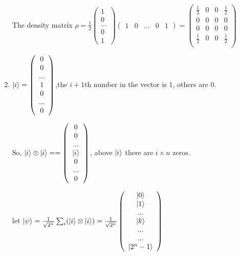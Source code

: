 \documentclass{article}
\begin{document}
\begin{enumerate}
          The density matrix $\rho=\frac{1}{2}\left(\begin{array}{c}1\\0\\...\\0\\1\end{array}\right)\left(\begin{array}{ccccc}1&0&...&0&1\end{array}\right)=
              \left(\begin{array}{cccc}
                      \frac{1}{2} & 0 & 0 & \frac{1}{2} \\
                      0           & 0 & 0 & 0           \\
                      0           & 0 & 0 & 0           \\
                      \frac{1}{2} & 0 & 0 & \frac{1}{2} \\
                  \end{array}\right)
          $
    \item $\ket{i}=\left(\begin{array}{c}
                      0 \\0\\...\\1\\0\\...\\0
                  \end{array}\right)$,the $i+1$th number in the vector is 1, others are 0.

          So, $\ket{i}\otimes\ket{i}==\left(\begin{array}{c}
                      0 \\0\\...\\\ket{i}\\0\\...\\0
                  \end{array}\right)$, above $\ket{i}$ there are $i\times n$ zeros.

          let $\ket{\psi}=\frac{1}{\sqrt{2^n}}\sum_i(\ket{i}\otimes\ket{i})=\frac{1}{\sqrt{2^n}}\left(\begin{array}{c}
                      \ket{0} \\\ket{1}\\...\\\ket{k}\\...\\...\\\ket{2^n-1}
                  \end{array}\right)$


\end{enumerate}
\end{document}
